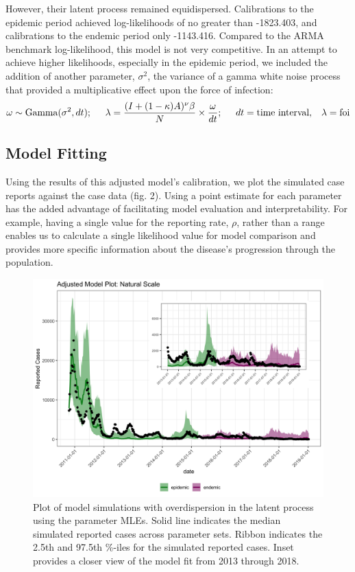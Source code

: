 \documentclass[12pt]{article}
\begin{document}
  However, their latent process remained equidispersed. Calibrations to the epidemic period achieved log-likelihoods of no greater than -1823.403, and calibrations to the endemic period only -1143.416. Compared to the ARMA benchmark log-likelihood, this model is not very competitive. In an attempt to achieve higher likelihoods, especially in the epidemic period, we included the addition of another parameter, $\sigma^2$, the variance of a gamma white noise process that provided a multiplicative effect upon the force of infection:
        \begin{equation}
        \omega \sim \mathrm{Gamma}(\sigma^2, dt); \hspace{5mm}
        \lambda = \frac{(I + (1 - \kappa)A)^{\nu}\beta}{N} \times \frac{\omega}{dt}; \hspace{5mm}
        dt = \textrm{time interval}, \hspace{3mm} \lambda = \textrm{foi}
        \end{equation}

\subsection{Model Fitting}

  Using the results of this adjusted model's calibration, we plot the simulated case reports against the case data (fig. 2). Using a point estimate for each parameter has the added advantage of facilitating model evaluation and interpretability. For example, having a single value for the reporting rate, $\rho$, rather than a range enables us to calculate a single likelihood value for model comparison and provides more specific information about the disease's progression through the population. 
        \begin{figure}[H]
          \centering
          \includegraphics[width=150mm]{adj_inset.png}
          \caption{Plot of model simulations with overdispersion in the latent process using the parameter MLEs. Solid line indicates the median simulated reported cases across parameter sets. Ribbon indicates the 2.5th and 97.5th \%-iles for the simulated reported cases. Inset provides a closer view of the model fit from 2013 through 2018.}
        \end{figure}
\end{document}

